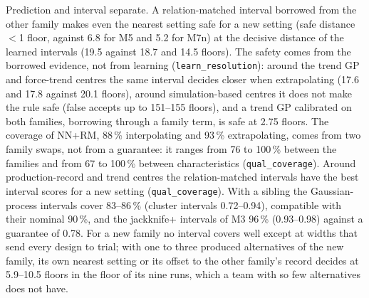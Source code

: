 \documentclass[pdflatex,sn-basic,lineno]{sn-jnl}
\newcommand{\res}[1]{\texttt{#1}}  %
\begin{document}
Prediction and interval separate. A relation-matched interval borrowed from the other family makes even the nearest setting safe for a new setting (safe distance $<$1 floor, against 6.8 for M5 and 5.2 for M7n) at the decisive distance of the learned intervals (19.5 against 18.7 and 14.5 floors). The safety comes from the borrowed evidence, not from learning (\res{learn\_resolution}): around the trend GP and force-trend centres the same interval decides closer when extrapolating (17.6 and 17.8 against 20.1 floors), around simulation-based centres it does not make the rule safe (false accepts up to 151--155 floors), and a trend GP calibrated on both families, borrowing through a family term, is safe at 2.75 floors. The coverage of NN+RM, 88\,\% interpolating and 93\,\% extrapolating, comes from two family swaps, not from a guarantee: it ranges from 76 to 100\,\% between the families and from 67 to 100\,\% between characteristics (\res{qual\_coverage}). Around production-record and trend centres the relation-matched intervals have the best interval scores \citep{gneiting2007strictly} for a new setting (\res{qual\_coverage}). With a sibling the Gaussian-process intervals cover 83--86\,\% (cluster intervals 0.72--0.94), compatible with their nominal 90\,\%, and the jackknife+ intervals of M3 96\,\% (0.93--0.98) against a guarantee of 0.78. For a new family no interval covers well except at widths that send every design to trial; with one to three produced alternatives of the new family, its own nearest setting or its offset to the other family's record decides at 5.9--10.5 floors in the floor of its nine runs, which a team with so few alternatives does not have.
\end{document}
